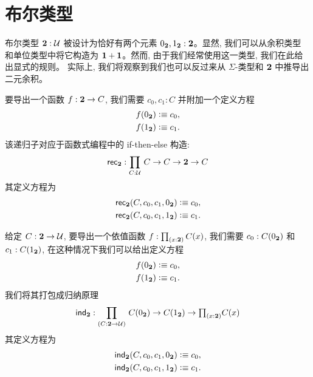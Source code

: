 %
%

\section{布尔类型}
\label{sec:type-booleans}

%
%
布尔类型 $\mathbf{2}:\mathcal{U}$ 被设计为恰好有两个元素 ${0_{\mathbf{2}}},{1_{\mathbf{2}}} : \mathbf{2}$。显然, 我们可以从余积类型
%
和单位类型中将它构造为 $\mathbf{1} + \mathbf{1}$。然而, 由于我们经常使用这一类型, 我们在此给出显式的规则。
实际上, 我们将观察到我们也可以反过来从 $\Sigma$-类型和 $\mathbf{2}$ 中推导出二元余积。

要导出一个函数 $f : \mathbf{2} \to C$, 我们需要 $c_0,c_1 : C$ 并附加一个定义方程
\begin{align*}
  f({0_{\mathbf{2}}}) &\vcentcolon\equiv c_0, \\
  f({1_{\mathbf{2}}})  &\vcentcolon\equiv c_1.
\end{align*}
该递归子对应于函数式编程中的 if-then-else 构造:
%
\[ \rec{\bool} : \prd{C:\UU}  C \to C \to \bool \to C \]
其定义方程为
\begin{align*}
  \mathsf{rec}_{\mathbf{2}}(C,c_0,c_1,{0_{\mathbf{2}}}) &\vcentcolon\equiv c_0, \\
  \mathsf{rec}_{\mathbf{2}}(C,c_0,c_1,{1_{\mathbf{2}}})  &\vcentcolon\equiv c_1.
\end{align*}

给定 $C : \mathbf{2} \to \mathcal{U}$, 要导出一个依值函数 $f : \prd{x:\bool}C(x)$, 我们需要 $c_0:C({0_{\mathbf{2}}})$ 和 $c_1 : C({1_{\mathbf{2}}})$, 在这种情况下我们可以给出定义方程
\begin{align*}
  f({0_{\mathbf{2}}}) &\vcentcolon\equiv c_0, \\
  f({1_{\mathbf{2}}})  &\vcentcolon\equiv c_1.
\end{align*}
我们将其打包成归纳原理
%
\[ \ind{\bool} : \dprd{C:\bool \to \UU}  C(\bfalse) \to C(\btrue)
\to \tprd{x:\bool} C(x) \]
其定义方程为
\begin{align*}
  \mathsf{ind}_{\mathbf{2}}(C,c_0,c_1,{0_{\mathbf{2}}}) &\vcentcolon\equiv c_0, \\
  \mathsf{ind}_{\mathbf{2}}(C,c_0,c_1,{1_{\mathbf{2}}})  &\vcentcolon\equiv c_1.
\end{align*}

